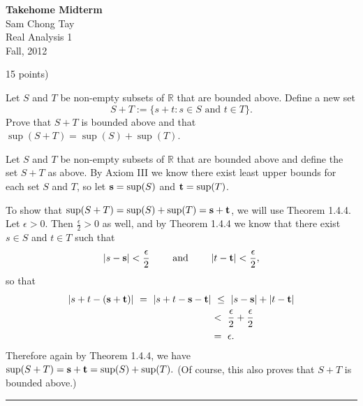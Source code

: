 \documentclass[12pt]{article}
\newcommand{\spand}{\qquad\text{ and }\qquad}
\newcommand{\R}{\mathbb R} %
\newcommand{\e}{\epsilon} %
\newenvironment{problem}[1]{\noindent {\bf Problem #1: }}{\medskip}
\newenvironment{proof}{\noindent {\bf Proof: }}{\hfill
\rule{1mm}{3mm} \bigskip}
\begin{document}
\begin{center}
{\bf Takehome Midterm}\\
Sam Chong Tay\\
Real Analysis 1\\
Fall, 2012
\end{center}



\begin{problem}{1} (15 points)

Let $S$ and $T$ be non-empty subsets of $\R$ that are bounded above.  Define a new set $$S+T:=\{s+t:s\in S\textrm{ and }t\in T\}.$$  Prove that $S+T$ is bounded above and that $\sup(S+T)=\sup(S)+\sup(T)$. \end{problem}

\begin{proof} Let $S$ and $T$ be non-empty subsets of $\R$ that are bounded above and define the set $S+T$ as above. By Axiom III we know there exist least upper bounds for each set $S$ and $T$, so let ${\bf s}=\sup(S)$ and ${\bf t}=\sup(T)$. %

To show that $\sup(S+T)=\sup(S)+\sup(T)={\bf s}+{\bf t}$, we will use Theorem 1.4.4. Let $\e>0$. Then $\frac{\e}{2} > 0 $ as well, and by Theorem 1.4.4 we know that there exist $s\in S$ and $t\in T$ such that $$|s-{\bf s}| < \frac{\e}{2} \spand |t-{\bf t}| < \frac{\e}{2},$$ so that
\begin{align*} |s+t- ({\bf s}+{\bf t})|\  = \ |s+t-{\bf s}-{\bf t}| & \ \leq \  |s-{\bf s}| + |t-{\bf t}|\\
										&< \  \frac{\e}{2} + \frac{\e}{2}\\
										&= \ \e.
\end{align*} Therefore again by Theorem 1.4.4, we have $\sup(S+T) = {\bf s} + {\bf t} = \sup(S)+\sup(T).$ (Of course, this also proves that $S+T$ is bounded above.)						
\end{proof}

\newpage
\end{document}
